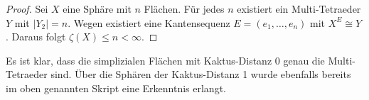 \documentclass[12pt,titlepage,twoside,cleardoublepage]{article}
\theoremstyle{nummermitklammern}
\numberwithin{equation}{section}
\DeclareMathOperator{\Pot}{Pot}
\begin{document}
\begin{proof}

Sei $X$ eine Sphäre mit $n$ Flächen. Für jedes $n$ existiert ein  Multi-Tetraeder $Y$ mit $\vert Y_2\vert =n .$ Wegen  existiert eine Kantensequenz $E=(e_1,\ldots,e_n)$ mit $X^E\cong Y$. Daraus folgt $\zeta(X)\leq n<\infty.$ 

\end{proof}
Es ist klar, dass die simplizialen Flächen mit Kaktus-Distanz $0$ genau die Multi-Tetraeder sind. Über die Sphären der Kaktus-Distanz 1 wurde ebenfalls bereits im oben genannten Skript eine Erkenntnis erlangt.
\end{document}

